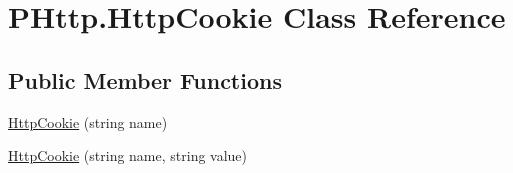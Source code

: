 \hypertarget{class_p_http_1_1_http_cookie}{}\section{P\+Http.\+Http\+Cookie Class Reference}
\label{class_p_http_1_1_http_cookie}
\subsection*{Public Member Functions}
\begin{DoxyCompactItemize}
\item 
\hyperlink{class_p_http_1_1_http_cookie_a7053d0b069f9e817142f94e211dcf01d}{Http\+Cookie} (string name)
\item 
\hyperlink{class_p_http_1_1_http_cookie_a685952d54bc37dca1979ef1932875fc4}{Http\+Cookie} (string name, string value)
\end{DoxyCompactItemize}
